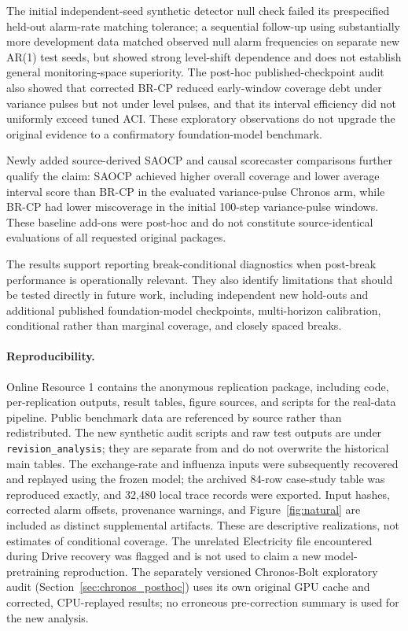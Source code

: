 \documentclass[10pt]{article}
\begin{document}
The initial independent-seed synthetic detector null check failed its prespecified held-out alarm-rate matching tolerance; a sequential follow-up using substantially more development data matched observed null alarm frequencies on separate new AR(1) test seeds, but showed strong level-shift dependence and does not establish general monitoring-space superiority. The post-hoc published-checkpoint audit also showed that corrected BR-CP reduced early-window coverage debt under variance pulses but not under level pulses, and that its interval efficiency did not uniformly exceed tuned ACI. These exploratory observations do not upgrade the original evidence to a confirmatory foundation-model benchmark.

Newly added source-derived SAOCP and causal scorecaster comparisons further
qualify the claim: SAOCP achieved higher overall coverage and lower
average interval score than BR-CP in the evaluated variance-pulse
Chronos arm, while BR-CP had lower miscoverage in the initial 100-step
variance-pulse windows. These baseline add-ons were post-hoc and do not
constitute source-identical evaluations of all requested original packages.

The results support reporting break-conditional diagnostics when post-break performance is operationally relevant. They also identify limitations that should be tested directly in future work, including independent new hold-outs and additional published foundation-model checkpoints, multi-horizon calibration, conditional rather than marginal coverage, and closely spaced breaks.

\paragraph{Reproducibility.} Online Resource 1 contains the anonymous replication package, including code, per-replication outputs, result tables, figure sources, and scripts for the real-data pipeline. Public benchmark data are referenced by source rather than redistributed. The
new synthetic audit scripts and raw test outputs are under
\texttt{revision\_analysis}; they are separate from and do not overwrite the
historical main tables. The exchange-rate and influenza inputs were subsequently recovered and
replayed using the frozen model; the archived 84-row case-study table was
reproduced exactly, and 32,480 local trace records were exported. Input
hashes, corrected alarm offsets, provenance warnings, and Figure~\ref{fig:natural}
are included as distinct supplemental artifacts. These are descriptive
realizations, not estimates of conditional coverage. The unrelated
Electricity file encountered during Drive recovery was flagged and is not
used to claim a new model-pretraining reproduction. The separately versioned
Chronos-Bolt exploratory audit (Section~\ref{sec:chronos_posthoc})
uses its own original GPU cache and corrected, CPU-replayed results;
no erroneous pre-correction summary is used for the new analysis.
\end{document}

